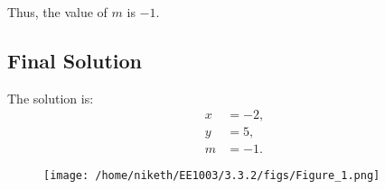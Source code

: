 \documentclass[journal]{IEEEtran}
\begin{document}
Thus, the value of \( m \) is \( \boxed{-1} \).

\subsection*{Final Solution}
The solution is:
\begin{align}
x &= -2, \\
y &= 5, \\
m &= -1.
\end{align}
	\begin{figure}[!ht]
		\centering
		\texttt{[image: /home/niketh/EE1003/3.3.2/figs/Figure\_1.png]}
		\caption{}
	\end{figure}
\end{document}

